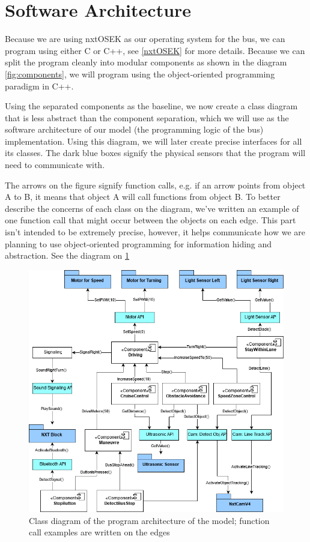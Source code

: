 \section{Software Architecture}

Because we are using nxtOSEK as our operating system for the bus, we can program using either C or C++, see \ref{nxtOSEK} for more details. Because we can split the program cleanly into modular components as shown in the diagram \ref{fig:components}, we will program using the object-oriented programming paradigm in C++. 

Using the separated components as the baseline, we now create a class diagram that is less abstract than the component separation, which we will use as the software architecture of our model (the programming logic of the bus) implementation. Using this diagram, we will later create precise interfaces for all its classes. The dark blue boxes signify the physical sensors that the program will need to communicate with. 

The arrows on the figure signify function calls, e.g. if an arrow points from object A to B, it means that object A will call functions from object B. To better describe the concerns of each class on the diagram, we've written an example of one function call that might occur between the objects on each edge. This part isn't intended to be extremely precise, however, it helps communicate how we are planning to use object-oriented programming for information hiding and abstraction. See the diagram on \ref{fig:softwareArchitecture}

\begin{figure}[ht]
    \includegraphics[width=\textwidth]{Images/Design/architectureClassDiagram.png}
    \caption{Class diagram of the program architecture of the model; function call examples are written on the edges}
    \label{fig:softwareArchitecture}
\end{figure}

